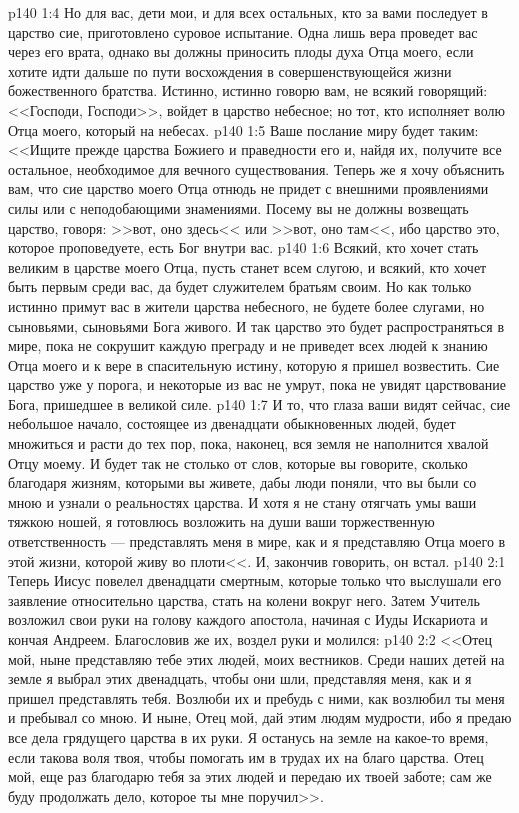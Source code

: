 \vs p140 1:4 Но для вас, дети мои, и для всех остальных, кто за вами последует в царство сие, приготовлено суровое испытание. Одна лишь вера проведет вас через его врата, однако вы должны приносить плоды духа Отца моего, если хотите идти дальше по пути восхождения в совершенствующейся жизни божественного братства. Истинно, истинно говорю вам, не всякий говорящий: <<Господи, Господи>>, войдет в царство небесное; но тот, кто исполняет волю Отца моего, который на небесах.
\vs p140 1:5 Ваше послание миру будет таким: <<Ищите прежде царства Божиего и праведности его и, найдя их, получите все остальное, необходимое для вечного существования. Теперь же я хочу объяснить вам, что сие царство моего Отца отнюдь не придет с внешними проявлениями силы или с неподобающими знамениями. Посему вы не должны возвещать царство, говоря: >>вот, оно здесь<< или >>вот, оно там<<, ибо царство это, которое проповедуете, есть Бог внутри вас.
\vs p140 1:6 Всякий, кто хочет стать великим в царстве моего Отца, пусть станет всем слугою, и всякий, кто хочет быть первым среди вас, да будет служителем братьям своим. Но как только истинно примут вас в жители царства небесного, не будете более слугами, но сыновьями, сыновьями Бога живого. И так царство это будет распространяться в мире, пока не сокрушит каждую преграду и не приведет всех людей к знанию Отца моего и к вере в спасительную истину, которую я пришел возвестить. Сие царство уже у порога, и некоторые из вас не умрут, пока не увидят царствование Бога, пришедшее в великой силе.
\vs p140 1:7 И то, что глаза ваши видят сейчас, сие небольшое начало, состоящее из двенадцати обыкновенных людей, будет множиться и расти до тех пор, пока, наконец, вся земля не наполнится хвалой Отцу моему. И будет так не столько от слов, которые вы говорите, сколько благодаря жизням, которыми вы живете, дабы люди поняли, что вы были со мною и узнали о реальностях царства. И хотя я не стану отягчать умы ваши тяжкою ношей, я готовлюсь возложить на души ваши торжественную ответственность --- представлять меня в мире, как и я представляю Отца моего в этой жизни, которой живу во плоти<<. И, закончив говорить, он встал.
\vs p140 2:1 Теперь Иисус повелел двенадцати смертным, которые только что выслушали его заявление относительно царства, стать на колени вокруг него. Затем Учитель возложил свои руки на голову каждого апостола, начиная с Иуды Искариота и кончая Андреем. Благословив же их, воздел руки и молился:
\vs p140 2:2 <<Отец мой, ныне представляю тебе этих людей, моих вестников. Среди наших детей на земле я выбрал этих двенадцать, чтобы они шли, представляя меня, как и я пришел представлять тебя. Возлюби их и пребудь с ними, как возлюбил ты меня и пребывал со мною. И ныне, Отец мой, дай этим людям мудрости, ибо я предаю все дела грядущего царства в их руки. Я останусь на земле на какое\hyp{}то время, если такова воля твоя, чтобы помогать им в трудах их на благо царства. Отец мой, еще раз благодарю тебя за этих людей и передаю их твоей заботе; сам же буду продолжать дело, которое ты мне поручил>>.

